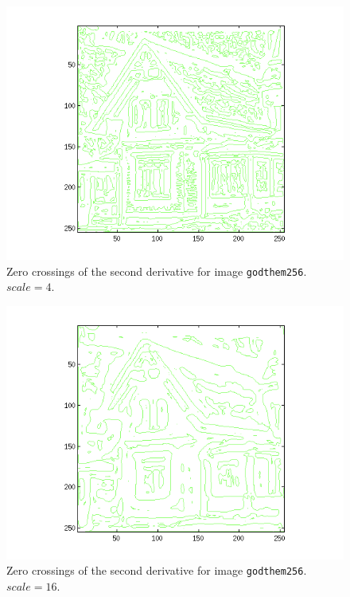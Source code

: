 \begin{figure}[H]
	\centering
	\includegraphics[scale=0.8]{./images/Q4/vv/4.png}
	\caption{Zero crossings of the second derivative for image \texttt{godthem256}. $scale = 4$.}
	\label{fig:Q4_vv_4}
\end{figure}

\begin{figure}[H]
	\centering
	\includegraphics[scale=0.8]{./images/Q4/vv/16.png}
	\caption{Zero crossings of the second derivative for image \texttt{godthem256}. $scale = 16$.}
	\label{fig:Q4_vv_16}
\end{figure}

